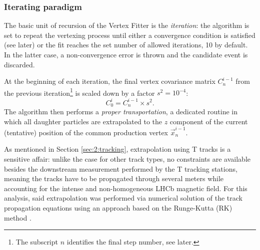 \subsubsection{Iterating paradigm}
The basic unit of recursion of the Vertex Fitter is the \textit{iteration}:
the algorithm is set to repeat the vertexing process until either a convergence condition is satisfied (see later) or the fit reaches the set number of allowed iterations, 10 by default.
In the latter case, a non-convergence error is thrown and the candidate event is discarded.

At the beginning of each iteration, the final vertex covariance matrix $C^{i-1}_n$ from the previous iteration\footnote{The subscript $n$ identifies the final step number, see later.} is scaled down by a factor $s^2 = {10}^{-4}$:
\begin{equation}
	C^{i}_0 = C^{i-1}_n \times s^2.
\end{equation}
The algorithm then performs a \textit{proper transportation}, a dedicated routine in which all daughter particles are extrapolated to the $z$ component of the current (tentative) position of the common production vertex $\vec{x}_n^{i-1}$.

As mentioned in Section \ref{sec:2:tracking}, extrapolation using T tracks is a sensitive affair:
unlike the case for other track types, no constraints are available besides the downstream measurement performed by the T tracking stations, meaning the tracks have to be propagated through several meters while accounting for the intense and non-homogeneous LHCb magnetic field.
For this analysis, said extrapolation was performed via numerical solution of the track propagation equations using an approach based on the Runge-Kutta (RK) method \cite{Bos:1070314} \cite{Hairer1993}.


%
%

